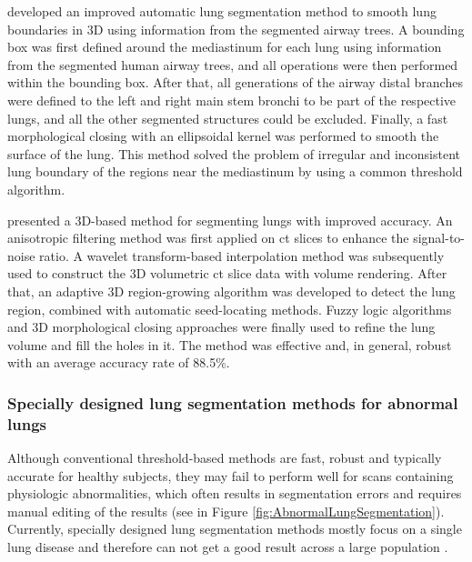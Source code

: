 \cite{ukil2005smoothing} developed an improved automatic lung segmentation method to smooth lung boundaries in 3D using information from the segmented airway trees. A bounding box was first defined around the mediastinum for each lung using information from the segmented human airway trees, and all operations were then performed within the bounding box. After that, all generations of the airway distal branches were defined to the left and right main stem bronchi to be part of the respective lungs, and all the other segmented structures could be excluded. Finally, a fast morphological closing with an ellipsoidal kernel was performed to smooth the surface of the lung. This method solved the problem of irregular and inconsistent lung boundary of the regions near the mediastinum by using a common threshold algorithm. 

\cite{sun20063d} presented a 3D-based method for segmenting lungs with improved accuracy. An anisotropic filtering method was first applied on \gls{ct} slices to enhance the signal-to-noise ratio. A wavelet transform-based interpolation method was subsequently used to construct the 3D volumetric \gls{ct} slice data with volume rendering. After that, an adaptive 3D region-growing algorithm was developed to detect the lung region, combined with automatic seed-locating methods. Fuzzy logic algorithms and 3D morphological closing approaches were finally used to refine the lung volume and fill the holes in it. The method was effective and, in general, robust with an average accuracy rate of 88.5\%.  

\subsubsection{Specially designed lung segmentation methods for abnormal lungs}
Although conventional threshold-based methods are fast, robust and typically accurate for healthy subjects, they may fail to perform well for scans containing physiologic abnormalities, which often results in segmentation errors and requires manual editing of the results (see in Figure \ref{fig:AbnormalLungSegmentation}). Currently, specially designed lung segmentation methods mostly focus on a single lung disease and therefore can not get a good result across a large population \citep{kitasaka2003lung,sluimer2005toward,pu2008adaptive,pu2011shape,prasad2008automatic,korfiatis2008texture,wang2009automated,van2009automatic,sun2012automated}. 


